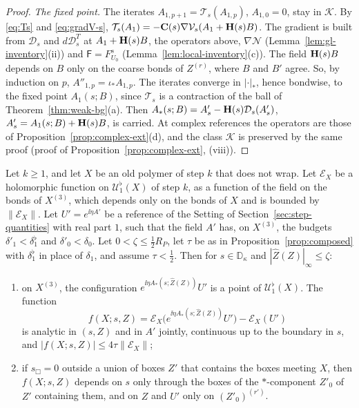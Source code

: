 \begin{proof}
\emph{The fixed point.} The iterates $A_{1,p+1}=\mathcal T_s(A_{1,p})$, $A_{1,0}=0$, stay in $\mathcal K$. By \eqref{eq:Ts} and \eqref{eq:gradV-s}, $\mathcal T_s(A_1)=-\mathbf C(s)\nabla\mathcal V_s(A_1+\mathbf H(s)B)$. The gradient is built from $\mathcal D_s$ and $d\mathcal D_s^T$ at $A_1+\mathbf H(s)B$, the operators above, $\nabla\mathcal N$ (Lemma~\ref{lem:gl-inventory}(ii)) and $\mathsf F=F^s_{U_0}$ (Lemma~\ref{lem:local-inventory}(c)). The field $\mathbf H(s)B$ depends on $B$ only on the coarse bonds of $Z^{(r)}$, where $B$ and $B'$ agree. So, by induction on $p$, $A''_{1,p}=\iota_*A_{1,p}$. The iterates converge in $|\cdot|_*$, hence bondwise, to the fixed point $A_1(s;B)$, since $\mathcal T_s$ is a contraction of the ball of Theorem~\ref{thm:weak-bg}(a). Then $A_*(s;B)=A'_s-\mathbf H(s)\mathcal D_s(A'_s)$, $A'_s=A_1(s;B)+\mathbf H(s)B$, is carried. At complex references the operators are those of Proposition~\ref{prop:complex-ext}(d), and the class $\mathcal K$ is preserved by the same proof (proof of Proposition~\ref{prop:complex-ext}, (viii)).
\end{proof}

\begin{lemma}\label{lem:gl-composed}
Let $k\ge1$, and let $X$ be an old polymer of step $k$ that does not wrap. Let $\mathcal E_X$ be a holomorphic function on $\mathcal U^\flat_1(X)$ of step $k$, as a function of the field on the bonds of $X^{(3)}$, which depends only on the bonds of $X$ and is bounded by $\|\mathcal E_X\|$. Let $U'=e^{\ii\eta A'}$ be a reference of the Setting of Section~\ref{sec:step-quantities} with real part $1$, such that the field $A'$ has, on $X^{(3)}$, the budgets $\delta'_1<\delta_1^\flat$ and $\delta'_0<\delta_0$. Let $0<\zeta\le\frac12R_P$, let $\tau$ be as in Proposition~\ref{prop:composed} with $\delta_1^\flat$ in place of $\delta_1$, and assume $\tau<\frac12$. Then for $s\in\mathbb D_\kappa$ and $|\hat Z(Z)|_\infty\le\zeta$:
\begin{enumerate}[label=(\alph*)]
\item on $X^{(3)}$, the configuration $e^{\ii\eta A_*(s;\hat Z(Z))}U'$ is a point of $\mathcal U^\flat_1(X)$. The function
\[
f(X;s,Z)=\mathcal E_X\big(e^{\ii\eta A_*(s;\hat Z(Z))}U'\big)-\mathcal E_X(U')
\]
is analytic in $(s,Z)$ and in $A'$ jointly, continuous up to the boundary in $s$, and $|f(X;s,Z)|\le4\tau\|\mathcal E_X\|$;
\item if $s_\Box=0$ outside a union of boxes $Z'$ that contains the boxes meeting $X$, then $f(X;s,Z)$ depends on $s$ only through the boxes of the $*$-component $Z'_0$ of $Z'$ containing them, and on $Z$ and $U'$ only on $(Z'_0)^{(r')}$.
\end{enumerate}
\end{lemma}

